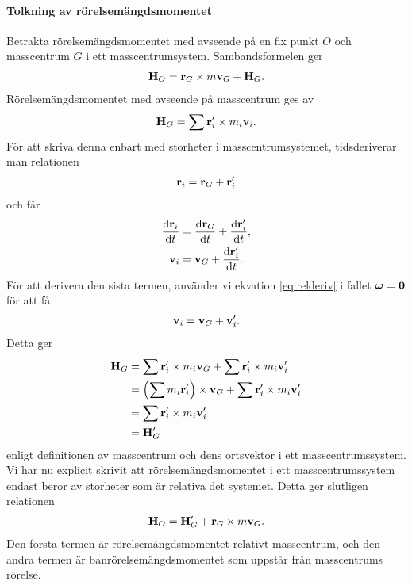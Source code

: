 \paragraph{Tolkning av rörelsemängdsmomentet}
Betrakta rörelsemängdsmomentet med avseende på en fix punkt $O$ och masscentrum $G$ i ett masscentrumsystem. Sambandsformelen ger
\begin{align*}
	\vb{H}_{O} = \vb{r}_{G}\times m\vb{v}_{G} + \vb{H}_{G}.
\end{align*}
Rörelsemängdsmomentet med avseende på masscentrum ges av
\begin{align*}
	\vb{H}_{G} = \sum\vb{r}_{i}'\times m_{i}\vb{v}_{i}.
\end{align*}
För att skriva denna enbart med storheter i masscentrumsystemet, tidsderiverar man relationen
\begin{align*}
	\vb{r}_{i} = \vb{r}_{G} + \vb{r}_{i}'
\end{align*}
och får
\begin{align*}
	\dv{\vb{r}_{i}}{t} &= \dv{\vb{r}_{G}}{t} + \dv{\vb{r}_{i}'}{t}, \\
	\vb{v}_{i}         &= \vb{v}_{G} + \dv{\vb{r}_{i}'}{t}.
\end{align*}
För att derivera den sista termen, använder vi ekvation \ref{eq:relderiv} i fallet $\vb*{\omega} = \vb{0}$ för att få
\begin{align*}
	\vb{v}_{i} = \vb{v}_{G} + \vb{v}_{i}'.
\end{align*}
Detta ger
\begin{align*}
	\vb{H}_{G} &= \sum\vb{r}_{i}'\times m_{i}\vb{v}_{G} + \sum\vb{r}_{i}'\times m_{i}\vb{v}_{i}' \\
	           &= \left(\sum m_{i}\vb{r}_{i}'\right)\times \vb{v}_{G} + \sum\vb{r}_{i}'\times m_{i}\vb{v}_{i}' \\
	           &= \sum\vb{r}_{i}'\times m_{i}\vb{v}_{i}' \\
	           &= \vb{H}_{G}'
\end{align*}
enligt definitionen av masscentrum och dens ortsvektor i ett masscentrumssystem. Vi har nu explicit skrivit att rörelsemängdsmomentet i ett masscentrumssystem endast beror av storheter som är relativa det systemet. Detta ger slutligen relationen
\begin{align*}
	\vb{H}_{O} = \vb{H}_{G}' + \vb{r}_{G}\times m\vb{v}_{G}.
\end{align*}
Den första termen är rörelsemängdsmomentet relativt masscentrum, och den andra termen är banrörelsemängdsmomentet som uppstår från masscentrums rörelse.

